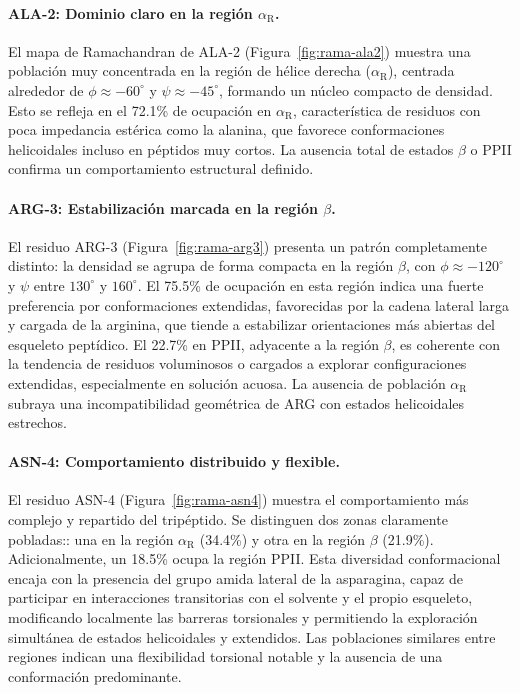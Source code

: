 \documentclass[12pt,a4paper]{article}
\begin{document}
\paragraph{ALA-2: Dominio claro en la región $\alpha_{\mathrm{R}}$.}
El mapa de Ramachandran de ALA-2 (Figura~\ref{fig:rama-ala2}) muestra una población muy concentrada en la región de hélice derecha ($\alpha_{\mathrm{R}}$), centrada alrededor de $\phi \approx -60^\circ$ y $\psi \approx -45^\circ$, formando un núcleo compacto de densidad. Esto se refleja en el 72.1\% de ocupación en $\alpha_{\mathrm{R}}$, característica de residuos con poca impedancia estérica como la alanina, que favorece conformaciones helicoidales incluso en péptidos muy cortos. La ausencia total de estados $\beta$ o PPII confirma un comportamiento estructural definido.

\paragraph{ARG-3: Estabilización marcada en la región $\beta$.}
El residuo ARG-3 (Figura~\ref{fig:rama-arg3}) presenta un patrón completamente distinto: la densidad se agrupa de forma compacta en la región $\beta$, con $\phi \approx -120^\circ$ y $\psi$ entre $130^\circ$ y $160^\circ$. El 75.5\% de ocupación en esta región indica una fuerte preferencia por conformaciones extendidas, favorecidas por la cadena lateral larga y cargada de la arginina, que tiende a estabilizar orientaciones más abiertas del esqueleto peptídico. El 22.7\% en PPII, adyacente a la región $\beta$, es coherente con la tendencia de residuos voluminosos o cargados a explorar configuraciones extendidas, especialmente en solución acuosa. La ausencia de población $\alpha_{\mathrm{R}}$ subraya una incompatibilidad geométrica de ARG con estados helicoidales estrechos.

\paragraph{ASN-4: Comportamiento distribuido y flexible.}
El residuo ASN-4 (Figura~\ref{fig:rama-asn4}) muestra el comportamiento más complejo y repartido del tripéptido. Se distinguen dos zonas claramente pobladas:: una en la región $\alpha_{\mathrm{R}}$ (34.4\%) y otra en la región $\beta$ (21.9\%). Adicionalmente, un 18.5\% ocupa la región PPII. Esta diversidad conformacional encaja con la presencia del grupo amida lateral de la asparagina, capaz de participar en interacciones transitorias con el solvente y el propio esqueleto, modificando localmente las barreras torsionales y permitiendo la exploración simultánea de estados helicoidales y extendidos. Las poblaciones similares entre regiones indican una flexibilidad torsional notable y la ausencia de una conformación predominante.
\end{document}
